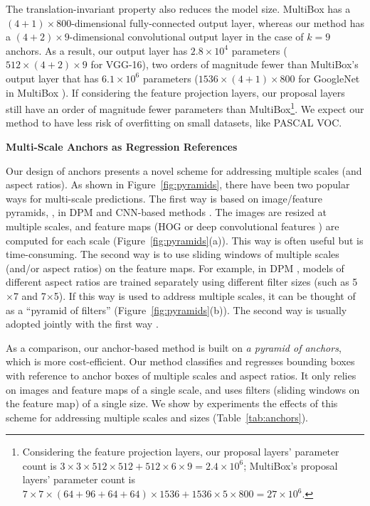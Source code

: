 \documentclass[10pt,journal,cspaper,compsoc]{IEEEtran}
\begin{document}
The translation-invariant property also reduces the model size.
MultiBox has a $(4+1)\times800$-dimensional fully-connected output layer, whereas our method has a $(4+2)\times9$-dimensional convolutional output layer in the case of $k=9$ anchors. As a result, our output layer has $2.8\times10^4$ parameters ($512\times(4+2)\times9$ for VGG-16), two orders of magnitude fewer than MultiBox's output layer that has $6.1\times10^6$ parameters ($1536\times(4+1)\times800$ for GoogleNet \cite{Szegedy2015} in MultiBox \cite{Szegedy2014a}).
If considering the feature projection layers, our proposal layers still have an order of magnitude fewer parameters than MultiBox\footnote{Considering the feature projection layers, our proposal layers' parameter count is $3\times3\times512\times512+512\times6\times9=2.4\times10^6$; MultiBox's proposal layers' parameter count is $7\times7\times(64+96+64+64)\times1536+1536\times5\times800=27\times10^6$.}. We expect our method to have less risk of overfitting on small datasets, like PASCAL VOC.


\vspace{.5em}
\noindent\textbf{Multi-Scale Anchors as Regression References}

Our design of anchors presents a novel scheme for addressing multiple scales (and aspect ratios).
As shown in Figure~\ref{fig:pyramids}, there have been two popular ways for multi-scale predictions. The first way is based on image/feature pyramids, \eg, in DPM \cite{Felzenszwalb2010} and CNN-based methods \cite{Sermanet2014,He2014,Girshick2015a}. The images are resized at multiple scales, and feature maps (HOG \cite{Felzenszwalb2010} or deep convolutional features \cite{Sermanet2014,He2014,Girshick2015a}) are computed for each scale (Figure~\ref{fig:pyramids}(a)). This way is often useful but is time-consuming. The second way is to use sliding windows of multiple scales (and/or aspect ratios) on the feature maps. For example, in DPM \cite{Felzenszwalb2010}, models of different aspect ratios are trained separately using different filter sizes (such as 5$\times$7 and 7$\times$5). If this way is used to address multiple scales, it can be thought of as a ``pyramid of filters'' (Figure~\ref{fig:pyramids}(b)). The second way is usually adopted jointly with the first way \cite{Felzenszwalb2010}.

As a comparison, our anchor-based method is built on \emph{a pyramid of anchors}, which is more cost-efficient. Our method classifies and regresses bounding boxes with reference to anchor boxes of multiple scales and aspect ratios.
It only relies on images and feature maps of a single scale, and uses filters (sliding windows on the feature map) of a single size. We show by experiments the effects of this scheme for addressing multiple scales and sizes (Table~\ref{tab:anchors}).
\end{document}
